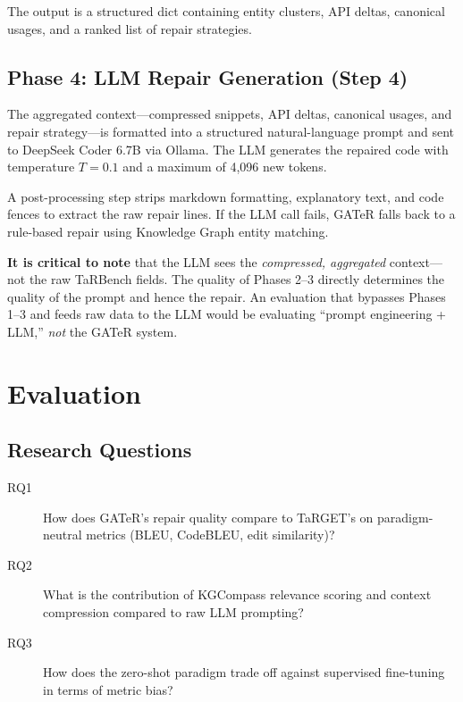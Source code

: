 \documentclass[conference,10pt]{IEEEtran}
\begin{document}
The output is a structured dict containing entity clusters, API deltas,
canonical usages, and a ranked list of repair strategies.

\subsection{Phase 4: LLM Repair Generation (Step 4)}

The aggregated context---compressed snippets, API deltas, canonical
usages, and repair strategy---is formatted into a structured
natural-language prompt and sent to DeepSeek Coder 6.7B via Ollama.
The LLM generates the repaired code with temperature $T{=}0.1$ and
a maximum of 4,096 new tokens.

A post-processing step strips markdown formatting, explanatory text, and
code fences to extract the raw repair lines. If the LLM call fails,
GATeR falls back to a rule-based repair using Knowledge Graph entity
matching.

\textbf{It is critical to note} that the LLM sees the \emph{compressed,
aggregated} context---not the raw TaRBench fields. The quality of
Phases 2--3 directly determines the quality of the prompt and hence the
repair. An evaluation that bypasses Phases 1--3 and feeds raw data to
the LLM would be evaluating ``prompt engineering + LLM,'' \emph{not}
the GATeR system.

\section{Evaluation}
\label{sec:evaluation}

\subsection{Research Questions}

\begin{description}
    \item[RQ1] How does GATeR's repair quality compare to TaRGET's on
               paradigm-neutral metrics (BLEU, CodeBLEU, edit similarity)?
    \item[RQ2] What is the contribution of KGCompass relevance scoring
               and context compression compared to raw LLM prompting?
    \item[RQ3] How does the zero-shot paradigm trade off against
               supervised fine-tuning in terms of metric bias?
\end{description}
\end{document}

